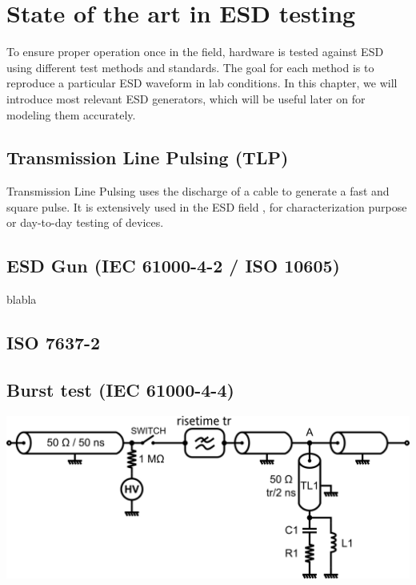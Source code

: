 \section{State of the art in ESD testing}

To ensure proper operation once in the field, hardware is tested against ESD using different test methods and standards.
The goal for each method is to reproduce a particular ESD waveform in lab conditions.
In this chapter, we will introduce most relevant ESD generators, which will be useful later on for modeling them accurately.

\subsection{Transmission Line Pulsing (TLP)}
Transmission Line Pulsing uses the discharge of a cable to generate a fast and square pulse.
It is extensively used in the ESD field \cite{TLP, TLPforESDProtectionCz, TLPthroubleshooting, LacrampeTransientImmunity}, for characterization purpose or day-to-day testing of devices.

\subsection{ESD Gun (IEC 61000-4-2 / ISO 10605)}
blabla

\subsection{ISO 7637-2}

\subsection{Burst test (IEC 61000-4-4)}

\includegraphics[width=\textwidth,height=\textheight,keepaspectratio]{src/2/figures/tlp_iec.png}
